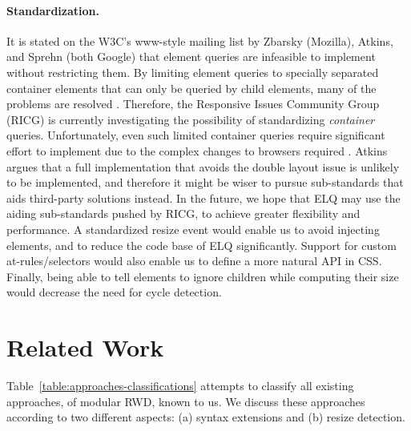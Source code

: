 \documentclass[]{llncs}
\newcommand{\elq}{ELQ}
\begin{document}
  \paragraph{Standardization.}
    It is stated on the W3C's www-style mailing list \cite{w3c_eq_mail} by Zbarsky (Mozilla), Atkins, and Sprehn (both Google) that element queries are infeasible to implement without restricting them.
    By limiting element queries to specially separated container elements that can only be queried by child elements, many of the problems are resolved \cite{ricg_irc_log,ricg_issue_viewport}.
    Therefore, the Responsive Issues Community Group (RICG) is currently investigating the possibility of standardizing \emph{container} queries.
    Unfortunately, even such limited container queries require significant effort to implement due to the complex changes to browsers required \cite{ricg_issue_viewport}.
    Atkins argues that a full implementation that avoids the double layout issue is unlikely to be implemented, and therefore it might be wiser to pursue sub-standards that aids third-party solutions instead.
    In the future, we hope that \elq{} may use the aiding sub-standards pushed by RICG, to achieve greater flexibility and performance.
    A standardized resize event would enable us to avoid injecting elements, and to reduce the code base of \elq{} significantly.
    Support for custom at-rules/selectors would also enable us to define a more natural API in CSS.
    Finally, being able to tell elements to ignore children while computing their size would decrease the need for cycle detection.

\section{Related Work}\label{sec:related}
  Table~\ref{table:approaches-classifications} attempts to classify all existing approaches, of modular RWD, known to us.
  We discuss these approaches according to two different aspects: (a) syntax extensions and (b) resize detection.
\end{document}
